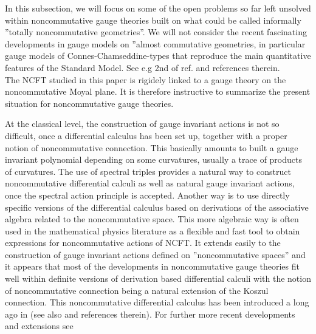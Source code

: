 \documentclass[10pt]{book}
\theoremstyle{break}
\begin{document}
In this subsection, we will focus on some of the open problems so far left unsolved within noncommutative gauge theories built on what could be called informally  ''totally noncommutative geometries''. We will not consider the recent fascinating developments in gauge models on ''almost commutative geometries, in particular gauge models of Connes-Chamseddine-types that reproduce the main quantitative features of the Standard Model. See e.g 2nd of ref. %
and references therein. \\
The NCFT studied in this paper is rigidely linked to a gauge theory on the noncommutative Moyal plane. It is therefore instructive to summarize the present situation for noncommutative gauge theories.\par
At the classical level, the construction of gauge invariant actions is not so difficult, once a differential calculus has been set up, together with a proper notion of noncommutative connection. This basically amounts to built a gauge invariant polynomial depending on some curvatures, usually a trace of products of curvatures. The use of spectral triples provides a natural way to construct noncommutative differential calculi as well as natural gauge invariant actions, once the spectral action principle is accepted. Another way is to use directly specific versions of the differential calculus based on derivations of the associative algebra related to the noncommutative space. This more algebraic way is often used in the mathematical physics literature as a flexible and fast tool to obtain expressions for noncommutative actions of NCFT. It extends easily to the construction of gauge invariant actions defined on ''noncommutative spaces'' and it appears that most of the developments in noncommutative gauge 
theories fit well within definite versions of derivation based differential calculi with the notion of noncommutative connection being a natural extension of the Koszul connection. This noncommutative differential calculus has been introduced a long ago in %
(see also %
and references therein). For further more recent developments and extensions see %
\end{document}
